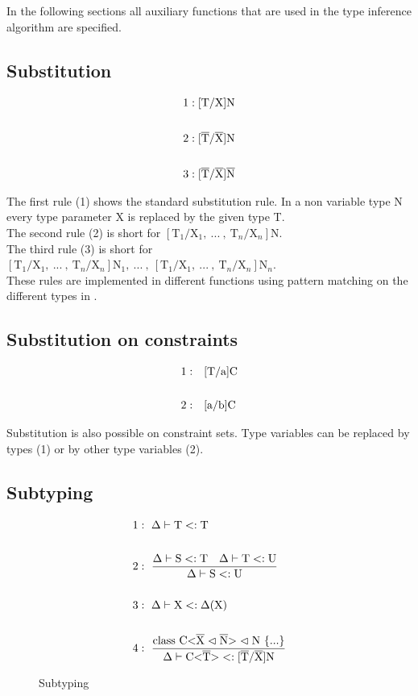 In the following sections all auxiliary functions that are used in the type inference algorithm are specified.

\subsection{Substitution}

\begin{align*}
1&: \text{[T/X]N}
\\
\\
2&: \text{[}\overline{\text{T}}/\overline{\text{X}}\text{]N}
\\
\\
3&: \text{[}\overline{\text{T}}/\overline{\text{X}}\text{]}\overline{\text{N}}
\end{align*}

The first rule (1) shows the standard substitution rule. In a non variable type N every type parameter X is replaced by the given type T.
\\
The second rule (2) is short for $[\text{T}_1/\text{X}_1, \ ... \ , \ \text{T}_n/\text{X}_n]\text{N}$.
\\
The third rule (3) is short for $[\text{T}_1/\text{X}_1, \ ... \ , \ \text{T}_n/\text{X}_n]\text{N}_1, \ ... \ , \ [\text{T}_1/\text{X}_1, \ ... \ , \ \text{T}_n/\text{X}_n]\text{N}_n$.
\\
These rules are implemented in different functions using pattern matching on the different types in .

\subsection{Substitution on constraints}

\begin{align*}
    1:& \quad \text{[T/a]C}\\
    \\
    2:& \quad \text{[a/b]C}
\end{align*}

Substitution is also possible on constraint sets. Type variables can be replaced by types (1) or by other type variables (2).

\subsection{Subtyping}

\begin{figure}[H]
    \begin{align*}
1&: \ \Delta \vdash \text{T} <: \text{T}
\\
\\
2&: \ \frac{\Delta \vdash \text{S} <: \text{T} \quad \Delta \vdash \text{T} <: \text{U}}{\Delta \vdash \text{S} <: \text{U}}
\\
\\
3&: \ \Delta \vdash \text{X} <: \Delta(\text{X})
\\
\\
4&: \ \frac{\text{class C<} \overline{\text{X}} \vartriangleleft \overline{\text{N}} \text{>} \vartriangleleft \text{N} \ \{...\}}{\Delta \vdash \text{C<}\overline{\text{T}}\text{>} <: \text{[}\overline{\text{T}}/\overline{\text{X}}\text{]N}}
    \end{align*}
    \caption{Subtyping}
    \label{subtyping}
\end{figure}

